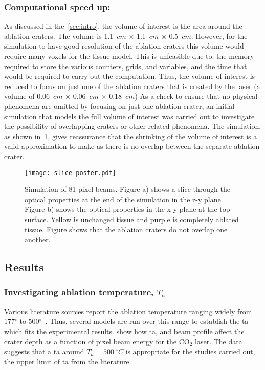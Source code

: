 \subsubsection*{Computational speed up:}
As discussed in the~\cref{sec:intro}, the volume of interest is the area around the ablation craters. The volume is 1.1~$cm$ $\times$ 1.1~$cm$ $\times$ 0.5~$cm$. However, for the simulation to have good resolution of the ablation craters this volume would require many voxels for the tissue model. This is unfeasible due to: the memory required to store the various counters, grids, and variables, and the time that would be required to carry out the computation. Thus, the volume of interest is reduced to focus on just one of the ablation craters that is created by the laser (a volume of  0.06~$cm$ $\times$ 0.06~$cm$ $\times$ 0.18~$cm$) 
As a check to ensure that no physical phenomena are omitted by focusing on just one ablation crater, an initial simulation that models the full volume of interest was carried out to investigate the possibility of overlapping craters or other related phenomena. The simulation, as shown in~\cref{fig:sizecheck}, gives reassurance that the shrinking of the volume of interest is a valid approximation to make as there is no overlap between the separate ablation crater.
\begin{figure}[!htbp]
	\centering
    \texttt{[image: slice-poster.pdf]}
    \caption{Simulation of 81 pixel beams. Figure a) shows a slice through the optical properties at the end of the simulation in the z-y plane. Figure b) shows the optical properties in the x-y plane at the top surface. Yellow is unchanged tissue and purple is completely ablated tissue. Figure shows that the ablation craters do not overlap one another.}
    \label{fig:sizecheck}
\end{figure}


\subsection{Results}

\subsubsection*{Investigating ablation temperature, \texorpdfstring{$T_a$}{Ta}}

Various literature sources report the ablation temperature ranging widely from 177$^{\circ}$ to 500$^{\circ}$~\cite{gerstmann1994char,mckenzie1986three,sagi1992heating}. Thus, several models are run over this range to establish the \gls*{ta} which fits the experimental results.  show how \gls*{ta}, and beam profile affect the crater depth as a function of pixel beam energy for the CO$_2$ laser. The data suggests that a \gls*{ta} around $T_a=500~^{\circ}C$ is appropriate for the studies carried out, the upper limit of \gls*{ta} from the literature.

